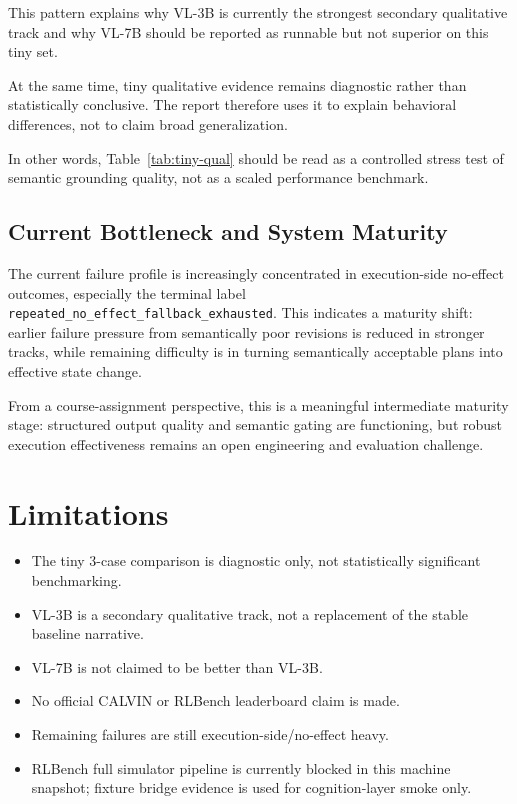 \documentclass{article}
\begin{document}
This pattern explains why VL-3B is currently the strongest secondary qualitative track and why VL-7B should be reported as runnable but not superior on this tiny set.

At the same time, tiny qualitative evidence remains diagnostic rather than statistically conclusive. The report therefore uses it to explain behavioral differences, not to claim broad generalization.

In other words, Table~\ref{tab:tiny-qual} should be read as a controlled stress test of semantic grounding quality, not as a scaled performance benchmark.

\subsection{Current Bottleneck and System Maturity}
The current failure profile is increasingly concentrated in execution-side no-effect outcomes, especially the terminal label \texttt{repeated\_no\_effect\_fallback\_exhausted}. This indicates a maturity shift: earlier failure pressure from semantically poor revisions is reduced in stronger tracks, while remaining difficulty is in turning semantically acceptable plans into effective state change.

From a course-assignment perspective, this is a meaningful intermediate maturity stage: structured output quality and semantic gating are functioning, but robust execution effectiveness remains an open engineering and evaluation challenge.

\section{Limitations}
\begin{itemize}[leftmargin=*]
  \item The tiny 3-case comparison is diagnostic only, not statistically significant benchmarking.
  \item VL-3B is a secondary qualitative track, not a replacement of the stable baseline narrative.
  \item VL-7B is not claimed to be better than VL-3B.
  \item No official CALVIN or RLBench leaderboard claim is made.
  \item Remaining failures are still execution-side/no-effect heavy.
  \item RLBench full simulator pipeline is currently blocked in this machine snapshot; fixture bridge evidence is used for cognition-layer smoke only.
\end{itemize}
\end{document}
